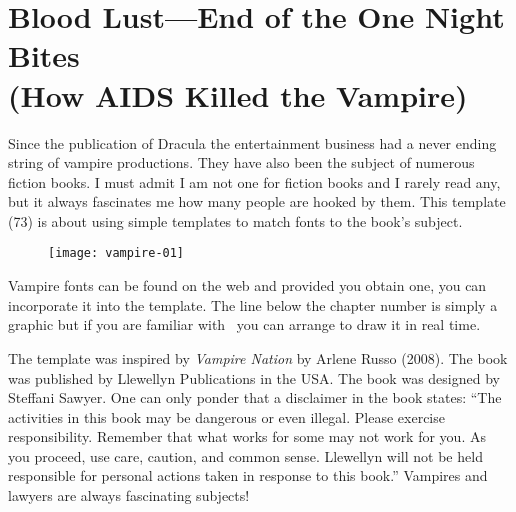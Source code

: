 \makeatletter\@specialfalse\makeatother
\newfontfamily{}


\debugchapter

\chapter[Template 72]{Blood Lust---End of the One Night Bites\\ (How AIDS Killed the Vampire)}

Since the publication of Dracula the entertainment business had a never ending string of vampire productions. They have also been the subject of numerous fiction books. I must admit I am not one for fiction books and I rarely read any,  but it always fascinates me how many people are hooked by them. This template (73) is about using simple 
templates to match fonts to the book’s subject. 

\begin{figure}[ht]
\centering
\texttt{[image: vampire-01]}
\end{figure}

Vampire fonts can be found on the web and provided you obtain one, you can incorporate it into the template. The line below the chapter number is simply a graphic but if you are familiar with \tikzname\ you can arrange to draw it
in real time. 

The template was inspired by \emph{Vampire Nation} by Arlene Russo (2008). The book was published by Llewellyn Publications in the USA. The book was designed by Steffani Sawyer. One can only ponder that a disclaimer in the book states: “The activities in this book may be dangerous or even illegal. Please exercise responsibility. Remember that what works for some may not work for you. As you proceed, use care, caution, and common sense. Llewellyn will not be held responsible for personal actions taken in response to this book.”  Vampires and lawyers are always fascinating subjects!

